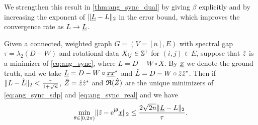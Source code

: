 We strengthen this result in \cref{thm:ang_sync_dual} by giving $\beta$ explicitly and by increasing the exponent of $\lVert \underline{L} - L \rVert_2$ in the error bound, which improves the convergence rate as $L \to \underline{L}$.
\medskip
\begin{theorem}
  Given a connected, weighted graph $G = (V = [n], E)$ with spectral gap $\tau = \lambda_2(D - W)$ and rotational data $X_{ij} \in \mathbb{S}^1$ for $(i, j) \in E$, suppose that $\hat{z}$ is a minimizer of \eqref{eq:ang_sync}, where $L = D - W \circ X$.  By $\underline{x}$ we denote the ground truth, and we take $\underline{L} = D - W \circ \underline{x} \underline{x}^*$ and $\hat{L} = D - W \circ \hat{z} \hat{z}^*$.  Then if $\lVert L - \hat{L} \rVert_2 < \frac{\tau}{1 + \sqrt{n}}$, $\hat{Z} = \hat{z} \hat{z}^*$ and $\mathfrak{R}(\hat{Z})$ are the unique minimizers of \eqref{eq:ang_sync_sdp} and \eqref{eq:ang_sync_real} and we have \begin{equation} \min_{\theta \in [0, 2\pi)} \lVert \hat{z} - \mathrm{e}^{\mathrm{i} \theta} \underline{x} \rVert_2 \le \dfrac{2 \sqrt{2 n} \lVert\underline{L} - L\rVert_2}{\tau}.\label{eq:ang_sync_bound}\end{equation}
  \label{thm:ang_sync_dual}
\end{theorem}

